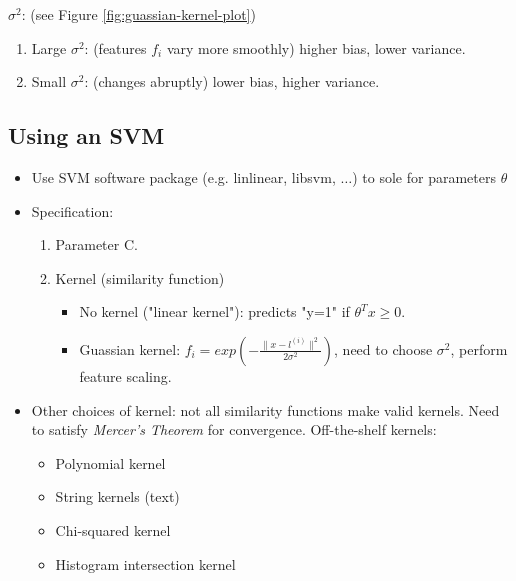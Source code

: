     \par \textbf{$\sigma^2$}: (see Figure \ref{fig:guassian-kernel-plot})
    \begin{enumerate}
        \item Large $\sigma^2$: (features $f_i$ vary more smoothly) higher bias, lower variance.
        \item Small $\sigma^2$: (changes abruptly) lower bias, higher variance.
    \end{enumerate}

\subsection{Using an SVM}
    \begin{itemize}
        \item Use SVM software package (e.g. linlinear, libsvm, $\dots$) to sole for parameters $\theta$
        \item Specification: 
            \begin{enumerate}
                \item Parameter C.
                \item Kernel (similarity function) 
                        \begin{itemize}
                            \item No kernel ("linear kernel"): predicts "y=1" if $\theta^T x \geq 0$.
                            \item Guassian kernel: $f_i = exp ( - \frac{\| x-l^{(i)}\|^2}{2\sigma^2})$, need to choose $\sigma^2$, perform feature scaling.
                        \end{itemize}
            \end{enumerate}
        \item Other choices of kernel: not all similarity functions make valid kernels. Need to satisfy \emph{Mercer's Theorem} for convergence. Off-the-shelf kernels:
            \begin{itemize}
                \item Polynomial kernel
                \item String kernels (text)
                \item Chi-squared kernel
                \item Histogram intersection kernel
            \end{itemize}
    \end{itemize}

